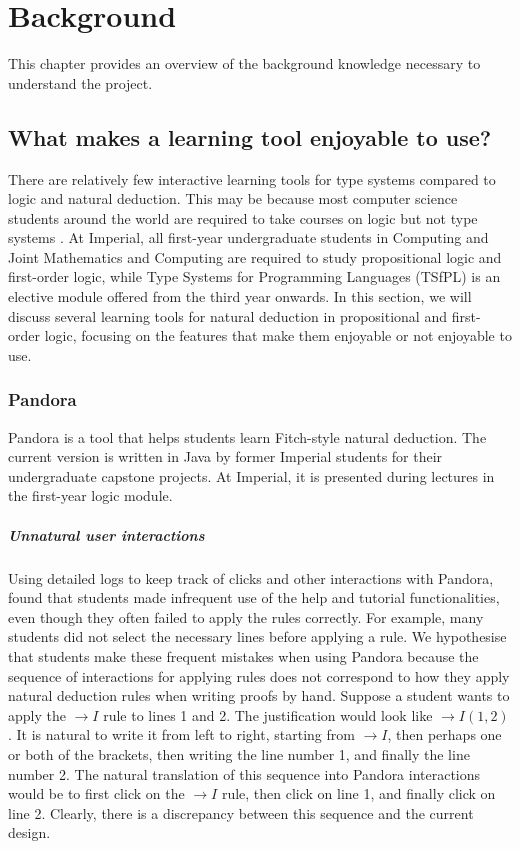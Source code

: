 \chapter{Background}
This chapter provides an overview of the background knowledge necessary to understand the project.




\section{What makes a learning tool enjoyable to use?}
There are relatively few interactive learning tools for type systems compared to logic and natural deduction. This may be because most computer science students around the world are required to take courses on logic but not type systems . At Imperial, all first-year undergraduate students in Computing and Joint Mathematics and Computing are required to study propositional logic and first-order logic, while Type Systems for Programming Languages (TSfPL) is an elective module offered from the third year onwards. In this section, we will discuss several learning tools for natural deduction in propositional and first-order logic, focusing on the features that make them enjoyable or not enjoyable to use.

\subsection{Pandora}
Pandora \cite{pandora:2007} is a tool that helps students learn Fitch-style natural deduction. The current version \cite{pandora} is written in Java by former Imperial students for their undergraduate capstone projects. At Imperial, it is presented during lectures in the first-year logic module.

\paragraph{Unnatural user interactions}
Using detailed logs to keep track of clicks and other interactions with Pandora, \cite{pandora:2007} found that students made infrequent use of the help and tutorial functionalities, even though they often failed to apply the rules correctly. For example, many students did not select the necessary lines before applying a rule. We hypothesise that students make these frequent mistakes when using Pandora because the sequence of interactions for applying rules does not correspond to how they apply natural deduction rules when writing proofs by hand. Suppose a student wants to apply the $\rightarrow I$ rule to lines 1 and 2. The justification would look like $\rightarrow I(1, 2)$. It is natural to write it from left to right, starting from $\rightarrow I$, then perhaps one or both of the brackets, then writing the line number 1, and finally the line number 2. The natural translation of this sequence into Pandora interactions would be to first click on the $\rightarrow I$ rule, then click on line 1, and finally click on line 2. Clearly, there is a discrepancy between this sequence and the current design.

